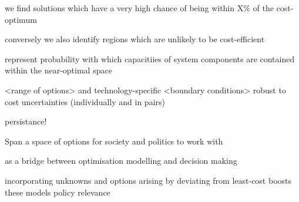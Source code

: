 we find solutions which have a very high chance of being within X\% of the cost-optimum

conversely we also identify regions which are unlikely to be cost-efficient

represent probability with which capacitiies of system components are contained
within the near-optimal space

<range of options> and technology-specific <boundary conditions> robust to cost uncertainties (individually and in pairs)

persistance!

Span a space of options for society and politics to work with

as a bridge between optimisation modelling and decision making

incorporating unknowns and options arising by deviating from least-cost
boosts these models policy relevance

